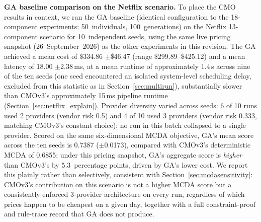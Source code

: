 \documentclass[journal]{IEEEtran}
\newcommand{\cmo}{CMO\xspace}
\newcommand{\cmothree}{CMOv3\xspace}
\begin{document}
\textbf{GA baseline comparison on the Netflix scenario.}
To place the \cmo results in context, we ran the GA baseline (identical
configuration to the 18-component experiments: 50~individuals,
100~generations) on the Netflix 13-component scenario for 10~independent
seeds, using the same live pricing snapshot (26~September~2026) as the other
experiments in this revision. The GA achieved a mean cost of \$334.86
$\pm$\$46.47 (range \$299.89--\$425.12) and a mean latency of 18.00
$\pm$2.38\,ms, at a mean runtime of approximately 1.4\,s across nine of the
ten seeds (one seed encountered an isolated system-level scheduling delay,
excluded from this statistic as in Section~\ref{sec:multirun}),
substantially slower than \cmothree's approximately 15\,ms pipeline runtime
(Section~\ref{sec:netflix_explain}). Provider
diversity varied across seeds: 6 of 10 runs used 2 providers (vendor risk
0.5) and 4 of 10 used 3 providers (vendor risk 0.333, matching \cmothree's
constant choice); no run in this batch collapsed to a single provider. Scored
on the same six-dimensional MCDA objective, GA's mean score across the ten
seeds is 0.7387 ($\pm$0.0173), compared with \cmothree's deterministic MCDA
of 0.6855; under this pricing snapshot, GA's aggregate score is
\emph{higher} than \cmothree's by 5.3~percentage points, driven by GA's lower
cost. We report this plainly rather than selectively, consistent with
Section~\ref{sec:mcdasensitivity}: \cmothree's contribution on this scenario
is not a higher MCDA score but a consistently enforced 3-provider
architecture on every run, regardless of which prices happen to be cheapest
on a given day, together with a full constraint-proof and rule-trace record
that GA does not produce.
\end{document}
